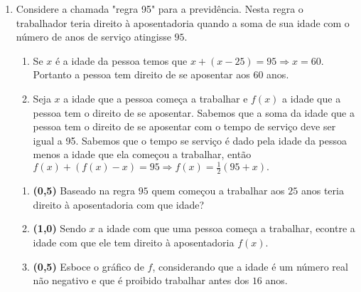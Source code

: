 \documentclass[a4paper,12pt]{article}
\begin{document}
\begin{enumerate}
\vspace{5mm}
\item Considere a chamada "regra 95" para a previdência.  Nesta regra o trabalhador teria direito à aposentadoria quando a soma de sua idade com o número de anos de serviço atingisse $95$. 
\begin{enumerate}
 \item Se $x$ é a idade da pessoa temos que $x+(x-25)=95\Rightarrow x=60$. Portanto a pessoa tem direito de se aposentar aos $60$ anos.
 \item Seja $x$ a idade que a pessoa começa a trabalhar e $f(x)$ a idade que a pessoa tem o direito de se aposentar. Sabemos que a soma da idade que a pessoa tem o direito de se aposentar com o tempo de serviço deve ser igual a 95.
 Sabemos que o tempo se serviço é dado pela idade da pessoa menos a idade que ela começou a trabalhar, então $f(x)+(f(x)-x)=95\Rightarrow f(x)=\frac{1}{2}(95+x).$
 \end{enumerate}
\begin{enumerate}
\item {\bf (0,5)} Baseado na regra $95$ quem começou a trabalhar aos $25$ anos teria direito à aposentadoria com que idade?
\item {\bf (1,0)} Sendo $x$ a idade com que uma pessoa começa a trabalhar, econtre a idade com que ele tem direito à aposentadoria $f(x)$.
\item{\bf (0,5)}  Esboce o gráfico de $f$, considerando que a idade é um número real não negativo e que é proibido trabalhar antes dos $16$ anos.
\end{enumerate}
\end{enumerate}
\end{document}
